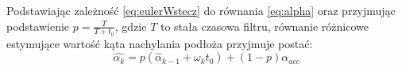 Podstawiając zależność \ref{eq:eulerWstecz} do równania \ref{eq:alpha} oraz przyjmując podstawienie $p = \frac{T}{T + t_0}$, gdzie $T$ to stała czasowa filtru,  równanie różnicowe estymujące wartość kąta nachylania podłoża przyjmuje postać:
\begin{equation}
    \hat{\alpha_{k}} = p(\hat{\alpha}_{k-1} + \omega_{k}t_0) + (1-p)\alpha_{acc}
\end{equation}
